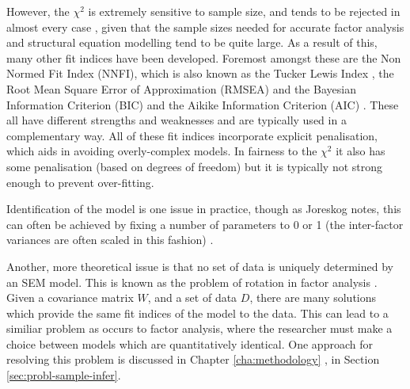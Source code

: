 However, the $\chi^2$
is extremely sensitive to sample size, and tends to be rejected in almost every case \cite{henson2006use}, given that the sample sizes needed for accurate factor analysis and structural equation modelling tend to be quite large. As a result of this, many other fit indices have been developed. Foremost amongst these are the Non Normed Fit Index (NNFI), which is also known as the Tucker Lewis Index \cite{bentler1990comparative}, the Root Mean Square Error of Approximation (RMSEA) \cite{rigdon1996cfi} and the Bayesian Information Criterion (BIC) \cite{schwarz1978estimating} and the Aikike Information Criterion (AIC) \cite{akaike1974new}. These all have different strengths and weaknesses and are typically used in a complementary way. All of these fit indices incorporate explicit penalisation, which aids in avoiding overly-complex models. In fairness to the $\chi^2$ it also has some penalisation (based on degrees of freedom) but it is typically not strong enough to prevent over-fitting. 



Identification of the model is one issue in practice, though as Joreskog notes, this can often be achieved by fixing a number of parameters to 0 or 1 (the inter-factor variances are often scaled in this fashion) \cite{joreskog1978structural}.

Another, more theoretical issue is that no set of data is uniquely determined by an SEM model. This is known as the problem of rotation in factor analysis \cite{maccallum2000applications}. Given a covariance matrix $W$, and a set of data $D$, there are many solutions which provide the same fit indices of the model to the data. This can lead to a similiar problem as occurs to factor analysis, where the researcher must make a choice between models which are quantitatively identical. One approach for resolving this problem is discussed in Chapter \ref{cha:methodology} , in Section \ref{sec:probl-sample-infer}.

